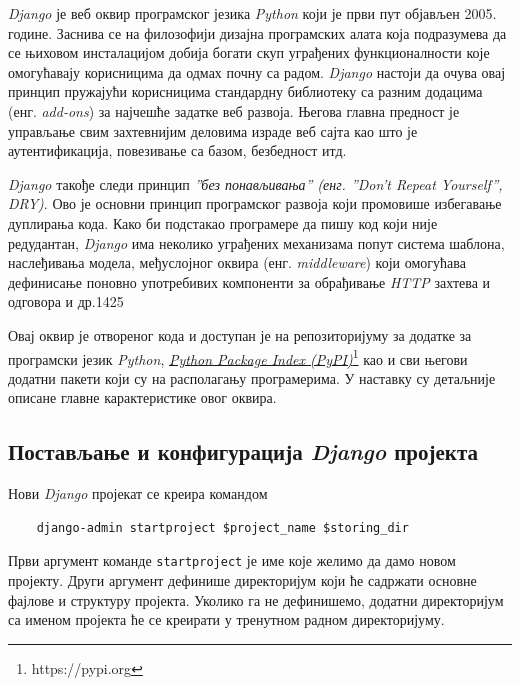 \documentclass[12pt,oneside]{memoir}
\begin{document}
\textit{Django} \cite{GuideToDjango, DjangoforAPIs} је веб оквир програмског језика \textit{Python} који је први пут објављен 2005. године. Заснива се на филозофији дизајна програмских алата која подразумева да се њиховом инсталацијом добија богати скуп уграђених функционалности које омогућавају корисницима да одмах почну са радом. \textit{Django} настоји да очува овај принцип пружајући корисницима стандардну библиотеку са разним додацима (енг. \textit{add-ons}) за најчешће задатке веб развоја. Његова главна предност је управљање свим захтевнијим деловима израде веб сајта као што је аутентификација, повезивање са базом, безбедност итд.

\textit{Django} такође следи принцип \textit{''без понављивања'' (енг. ''Don't Repeat Yourself'', DRY)}. Ово је основни принцип програмског развоја који промовише избегавање дуплирања кода. Како би подстакао програмере да пишу код који није редудантан, \textit{Django} има неколико уграђених механизама попут система шаблона, наслеђивања модела, међуслојног оквира (енг. \textit{middleware}) који омогућава дефинисање поновно употребивих компоненти за обрађивање \textit{HTTP} захтева и одговора и др.1425

Овај оквир је отвореног кода и доступан је на репозиторијуму за додатке за 
програмски језик \textit{Python}, \textit{\href{https://pypi.org}{Python Package Index (PyPI)}}\footnote{https://pypi.org} као и сви његови додатни пакети који су на располагању програмерима. У наставку су детаљније описане главне карактеристике овог оквира.


\subsection{Постављање и конфигурација \textit{Django} пројекта}

Нови \textit{Django} пројекат се креира командом

\begin{lstlisting}
    django-admin startproject $project_name $storing_dir
\end{lstlisting}


Први аргумент команде \texttt{startproject} је име које желимо да дамо новом пројекту. Други аргумент дефинише директоријум који ће садржати основне фајлове и структуру пројекта. Уколико га не дефинишемо, додатни директоријум са именом пројекта ће се креирати у тренутном радном директоријуму.
\end{document}

